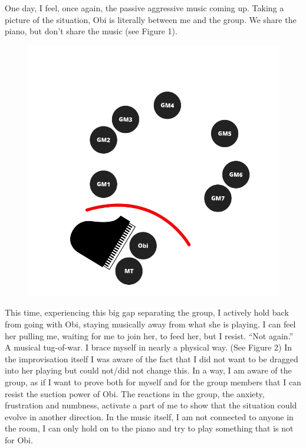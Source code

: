 \documentclass[authordate, empirical, issue]{jote-new-article}
\begin{document}
One day, I feel, once again, the passive aggressive music coming up. Taking a picture of the situation, Obi is literally between me and the group. We share the piano, but don't share the music (see Figure 1).



\begin{figure}

  \includegraphics[width=\linewidth]{media/image1.png}

  \caption{}

  \label{fig:rId5}


\end{figure}



This time, experiencing this big gap separating the group, I actively hold back from going with Obi, staying musically away from what she is playing. I can feel her pulling me, waiting for me to join her, to feed her, but I resist. “Not again.” A musical tug-of-war. I brace myself in nearly a physical way. (See Figure 2) In the improvisation itself I was aware of the fact that I did not want to be dragged into her playing but could not/did not change this. In a way, I am aware of the group, as if I want to prove both for myself and for the group members that I can resist the suction power of Obi. The reactions in the group, the anxiety, frustration and numbness, activate a part of me to show that the situation could evolve in another direction. In the music itself, I am not connected to anyone in the room, I can only hold on to the piano and try to play something that is not for Obi.
\end{document}
